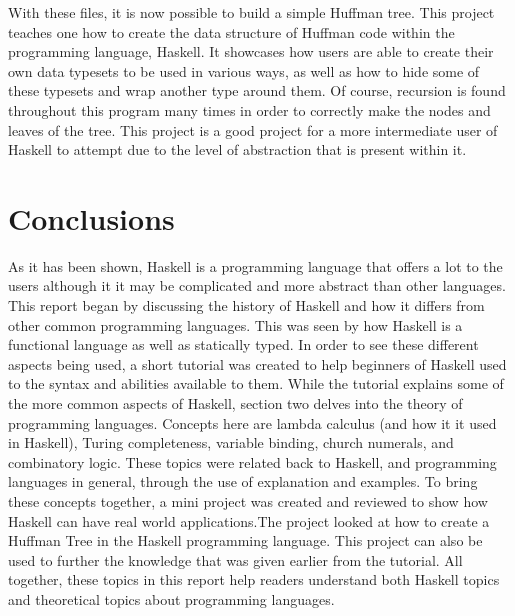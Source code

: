 \documentclass{article}
\begin{document}
With these files, it is now possible to build a simple Huffman tree. This project teaches one how to create the data structure of Huffman code within the programming language, Haskell. 
It showcases how users are able to create their own data typesets to be used in various ways, as well as how to hide some of these typesets and wrap another type around them. Of course, recursion is found throughout this program many times in order to correctly make the nodes and leaves of the tree. This project is a good project for a more intermediate user of Haskell to attempt due to the level of abstraction that is present within it.


\section{Conclusions}\label{conclusions}
As it has been shown, Haskell is a programming language that offers a lot to the users although it it may be complicated and more abstract than other languages. This report began by discussing the history of Haskell and how it differs from other common programming languages. This was seen by how Haskell is a functional language as well as statically typed. In order to see these different aspects being used, a short tutorial was created to help beginners of Haskell used to the syntax and abilities available to them. While the tutorial explains some of the more common aspects of Haskell, section two delves into the theory of programming languages. Concepts here are lambda calculus (and how it it used in Haskell), Turing completeness, variable binding, church numerals, and combinatory logic. These topics were related back to Haskell, and programming languages in general, through the use of explanation and examples. To bring these concepts together, a mini project was created and reviewed to show how Haskell can have real world applications.The project looked at how to create a Huffman Tree in the Haskell programming language. This project can also be used to further the knowledge that was given earlier from the tutorial. All together, these topics in this report help readers understand both Haskell topics and theoretical topics about programming languages.
\end{document}
